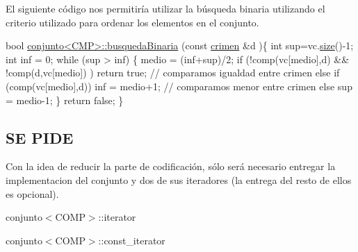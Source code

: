 El siguiente código nos permitiría utilizar la búsqueda binaria utilizando el criterio utilizado para ordenar los elementos en el conjunto. 
\begin{DoxyCode}
\textcolor{keywordtype}{bool} \hyperlink{classconjunto}{conjunto<CMP>::busquedaBinaria} (\textcolor{keyword}{const} \hyperlink{classcrimen}{crimen} &d )\{
    \textcolor{keywordtype}{int} sup=vc.\hyperlink{classconjunto_aa2d78be0b9fd7aecf1fccf9ad502b907}{size}()-1;
    \textcolor{keywordtype}{int} inf = 0;
    \textcolor{keywordflow}{while} (sup > inf) \{
      medio = (inf+sup)/2;
      \textcolor{keywordflow}{if} (!comp(vc[medio],d) && !comp(d,vc[medio]) ) \textcolor{keywordflow}{return} \textcolor{keyword}{true};  \textcolor{comment}{// comparamos igualdad entre crimen}
      \textcolor{keywordflow}{else} \textcolor{keywordflow}{if} (comp(vc[medio],d)) inf = medio+1; \textcolor{comment}{// comparamos menor entre crimen}
      \textcolor{keywordflow}{else} sup = medio-1;
    \}
    \textcolor{keywordflow}{return} \textcolor{keyword}{false};
\}
\end{DoxyCode}
\hypertarget{index_SP2}{}\subsection{S\-E P\-I\-D\-E}\label{index_SP2}
Con la idea de reducir la parte de codificación, sólo será necesario entregar la implementacion del conjunto y dos de sus iteradores (la entrega del resto de ellos es opcional). \begin{DoxyItemize}
\item conjunto$<$\-C\-O\-M\-P$>$\-::iterator \item conjunto$<$\-C\-O\-M\-P$>$\-::const\-\_\-iterator\end{DoxyItemize}
